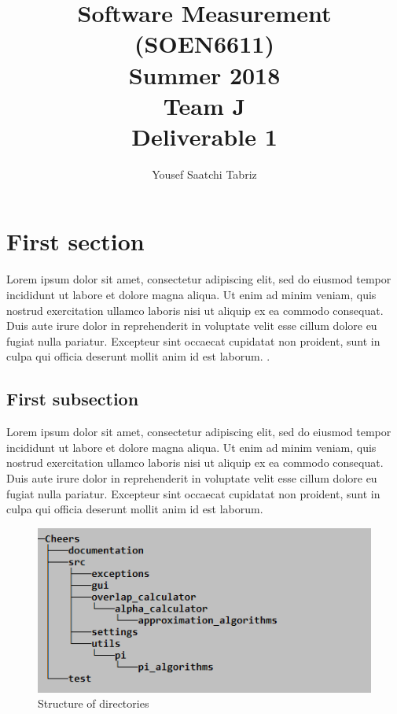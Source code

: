 \documentclass[11pt]{article}
\begin{document}
\title{Software Measurement (SOEN6611)\\Summer 2018\\Team J\\Deliverable 1}
\author{Yousef Saatchi Tabriz}
\date{}
\maketitle

\tableofcontents

\newpage
\section{First section}
Lorem ipsum dolor sit amet, consectetur adipiscing elit, sed do eiusmod tempor incididunt ut labore et dolore magna aliqua. Ut enim ad minim veniam, quis nostrud exercitation ullamco laboris nisi ut aliquip ex ea commodo consequat. Duis aute irure dolor in reprehenderit in voluptate velit esse cillum dolore eu fugiat nulla pariatur. Excepteur sint occaecat cupidatat non proident, sunt in culpa qui officia deserunt mollit anim id est laborum. \cite{microsoft3}. 

\subsection{First subsection}
Lorem ipsum dolor sit amet, consectetur adipiscing elit, sed do eiusmod tempor incididunt ut labore et dolore magna aliqua. Ut enim ad minim veniam, quis nostrud exercitation ullamco laboris nisi ut aliquip ex ea commodo consequat. Duis aute irure dolor in reprehenderit in voluptate velit esse cillum dolore eu fugiat nulla pariatur. Excepteur sint occaecat cupidatat non proident, sunt in culpa qui officia deserunt mollit anim id est laborum.
\begin{figure}[h]
	\centering
		\includegraphics[]{Packages.png}
	\caption{Structure of directories}
	\label{fig:packages}
\end{figure}
 
\end{document}
